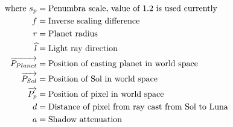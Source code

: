 \begin{align*}
\text{where}~
s_p &= \text{Penumbra scale, value of 1.2 is used currently} \notag\\
f &= \text{Inverse scaling difference} \notag\\
r &= \text{Planet radius} \notag\\
\widehat{l} &= \text{Light ray direction} \notag\\
\overrightarrow{P_{Planet}} &= \text{Position of casting planet in world space} \notag\\
\overrightarrow{P_{Sol}} &= \text{Position of Sol in world space} \notag\\
\overrightarrow{P_{p}} &= \text{Position of pixel in world space} \notag\\
d &= \text{Distance of pixel from ray cast from Sol to Luna} \notag\\
a &= \text{Shadow attenuation} \notag\\
\end{align*}
\onehalfspacing
